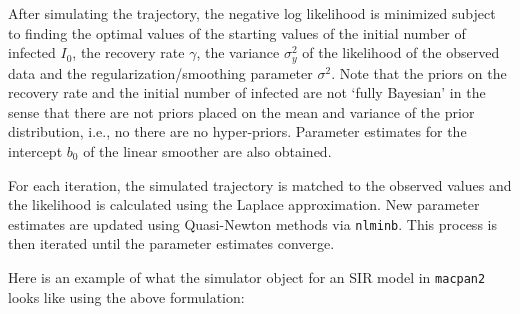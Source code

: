 \documentclass[
11pt, %
oneside, %
english, %
singlespacing, %
]{macthesis} %
\begin{document}
After simulating the trajectory, the negative log likelihood is minimized subject to finding the optimal values of the starting values of the initial number of infected \(I_0\), the recovery rate \(\gamma\), the variance \(\sigma^2_y\) of the likelihood of the observed data and the regularization/smoothing parameter \(\sigma^2\). Note that the priors on the recovery rate and the initial number of infected are not `fully Bayesian' in the sense that there are not priors placed on the mean and variance of the prior distribution, i.e., no there are no hyper-priors. Parameter estimates for the intercept \(b_0\) of the linear smoother are also obtained.

For each iteration, the simulated trajectory is matched to the observed values and the likelihood is calculated using the Laplace approximation. New parameter estimates are updated using Quasi-Newton methods via \texttt{nlminb}. This process is then iterated until the parameter estimates converge.

Here is an example of what the simulator object for an SIR model in \texttt{macpan2} looks like using the above formulation:
\end{document}

